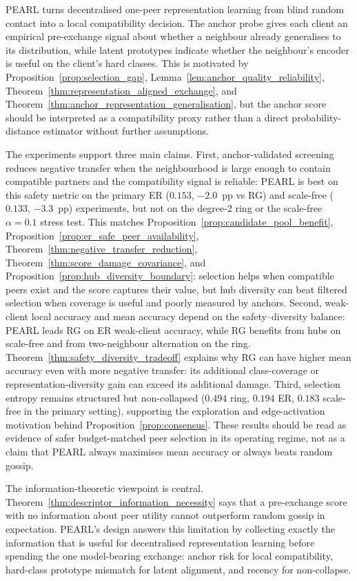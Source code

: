\documentclass[conference]{IEEEtran}
\begin{document}
PEARL turns decentralised one-peer representation learning from blind random contact into a local compatibility decision. The anchor probe gives each client an empirical pre-exchange signal about whether a neighbour already generalises to its distribution, while latent prototypes indicate whether the neighbour's encoder is useful on the client's hard classes. This is motivated by Proposition~\ref{prop:selection_gap}, Lemma~\ref{lem:anchor_quality_reliability}, Theorem~\ref{thm:representation_aligned_exchange}, and Theorem~\ref{thm:anchor_representation_generalisation}, but the anchor score should be interpreted as a compatibility proxy rather than a direct probability-distance estimator without further assumptions.

The experiments support three main claims. First, anchor-validated screening reduces negative transfer when the neighbourhood is large enough to contain compatible partners and the compatibility signal is reliable: \textsc{PEARL} is best on this safety metric on the primary ER ($0.153$, $-2.0$~pp vs \textsc{RG}) and scale-free ($0.133$, $-3.3$~pp) experiments, but not on the degree-2 ring or the scale-free $\alpha=0.1$ stress test. This matches Proposition~\ref{prop:candidate_pool_benefit}, Proposition~\ref{prop:er_safe_peer_availability}, Theorem~\ref{thm:negative_transfer_reduction}, Theorem~\ref{thm:score_damage_covariance}, and Proposition~\ref{prop:hub_diversity_boundary}: selection helps when compatible peers exist and the score captures their value, but hub diversity can beat filtered selection when coverage is useful and poorly measured by anchors. Second, weak-client local accuracy and mean accuracy depend on the safety--diversity balance: \textsc{PEARL} leads \textsc{RG} on ER weak-client accuracy, while \textsc{RG} benefits from hubs on scale-free and from two-neighbour alternation on the ring. Theorem~\ref{thm:safety_diversity_tradeoff} explains why \textsc{RG} can have higher mean accuracy even with more negative transfer: its additional class-coverage or representation-diversity gain can exceed its additional damage. Third, selection entropy remains structured but non-collapsed ($0.494$ ring, $0.194$ ER, $0.183$ scale-free in the primary setting), supporting the exploration and edge-activation motivation behind Proposition~\ref{prop:consensus}. These results should be read as evidence of safer budget-matched peer selection in its operating regime, not as a claim that PEARL always maximises mean accuracy or always beats random gossip.

The information-theoretic viewpoint is central. Theorem~\ref{thm:descriptor_information_necessity} says that a pre-exchange score with no information about peer utility cannot outperform random gossip in expectation. PEARL's design answers this limitation by collecting exactly the information that is useful for decentralised representation learning before spending the one model-bearing exchange: anchor risk for local compatibility, hard-class prototype mismatch for latent alignment, and recency for non-collapse.
\end{document}
